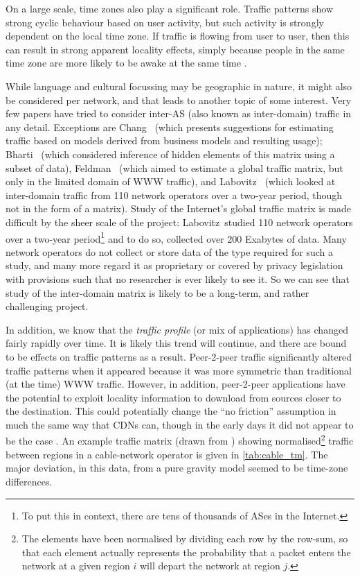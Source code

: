 On a large scale, time zones also play a significant role. Traffic
patterns show strong cyclic behaviour based on user activity, but such
activity is strongly dependent on the local time zone. If traffic is
flowing from user to user, then this can result in strong apparent
locality effects, simply because people in the same time zone are more
likely to be awake at the same time \cite{gerber:03}. 
 
While language and cultural focussing may be geographic in nature, it
might also be considered per network, and that leads to another topic
of some interest. Very few papers have tried to consider inter-AS
(also known as inter-domain) traffic in any detail. Exceptions are
Chang~\etal\cite{Chang05EmpiricalAS} (which presents suggestions for
estimating traffic based on models derived from business models and resulting
usage); Bharti~\etal\cite{Bharti10Invisible} (which considered
inference of hidden elements of this matrix using a subset of data),
Feldman~\etal\cite{Feldmann04Web} (which aimed to estimate a global
traffic matrix, but only in the limited domain of WWW traffic), and
Labovitz~\etal\cite{labovitz10:_inter_inter_domain_traff} (which
looked at inter-domain traffic from 110 network operators over a
two-year period, though not in the form of a matrix). Study of the
Internet's global traffic matrix is made difficult by the sheer scale
of the project: Labovitz~\etal studied 110 network operators over a
two-year period\footnote{To put this in context, there are tens of
  thousands of ASes in the Internet.} and to do so, collected over 200
Exabytes of data. Many network operators do not collect or store data
of the type required for such a study, and many more regard it as
proprietary or covered by privacy legislation with provisions such
that no researcher is ever likely to see it. So we can see that study
of the inter-domain matrix is likely to be a long-term, and rather
challenging project.

In addition, we know that the {\em traffic profile} (or mix of
applications) has changed fairly rapidly over time. It is likely this
trend will continue, and there are bound to be effects on traffic
patterns as a result. Peer-2-peer traffic significantly altered
traffic patterns when it appeared because it was more symmetric than
traditional (at the time) WWW traffic. However, in addition,
peer-2-peer applications have the potential to exploit locality
information to download from sources closer to the destination. This
could potentially change the ``no friction'' assumption in much the
same way that CDNs can, though in the early days it did not appear to
be the case \cite{gerber:03}. An example traffic matrix (drawn from
\cite{gerber:03}) showing normalised\footnote{The elements have been
  normalised by dividing each row by the row-sum, so that each element
  actually represents the probability that a packet enters the network
  at a given region $i$ will depart the network at region $j$.}
traffic between regions in a cable-network operator is given in
\autoref{tab:cable_tm}. The major deviation, in this data, from a pure
gravity model seemed to be time-zone differences.

